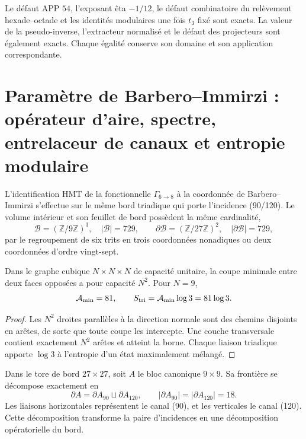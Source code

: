 \begin{remark}
Le défaut APP \(54\), l’exposant êta \(-1/12\), le défaut
combinatoire du relèvement hexade--octade et les
identités modulaires une fois \(t_3\) fixé sont exacts. La valeur
de la pseudo-inverse, l’extracteur normalisé et le défaut des projecteurs sont également exacts.
Chaque égalité conserve son domaine et son application correspondante.
\end{remark}


\section{Paramètre de Barbero--Immirzi : opérateur d'aire, spectre,
entrelaceur de canaux et entropie modulaire}
\label{p12-83-c14-s2:sec:area-entrelazamiento-barbero-rev11}

L'identification HMT de la fonctionnelle \(\Gamma_{6\to8}\) à la coordonnée
de Barbero--Immirzi s'effectue sur le même bord triadique qui porte
l'incidence (90/120). Le volume intérieur et son feuillet de bord possèdent la même cardinalité,
\[
 \mathcal B=(\mathbb Z/9\mathbb Z)^3,
 \quad |\mathcal B|=729,
 \qquad
 \partial\mathcal B=(\mathbb Z/27\mathbb Z)^2,
 \quad |\partial\mathcal B|=729,
\]
par le regroupement de six trits en trois coordonnées nonadiques ou deux
coordonnées d’ordre vingt-sept.

\begin{theorem}
\label{p12-83-c14-s2:thm:ley-areal-corte-triadico-rev11}
Dans le graphe cubique \(N\times N\times N\) de capacité unitaire, la coupe
minimale entre deux faces opposées a pour capacité \(N^2\). Pour \(N=9\),
\[
 \mathcal A_{\min}=81,
 \qquad S_{\rm tri}=\mathcal A_{\min}\log3=81\log3.
\]
\end{theorem}
\begin{proof}
Les \(N^2\) droites parallèles à la direction normale sont des chemins disjoints en
arêtes, de sorte que toute coupe les intercepte. Une couche transversale contient
exactement \(N^2\) arêtes et atteint la borne. Chaque liaison triadique apporte
\(\log3\) à l’entropie d’un état maximalement mélangé.
\end{proof}

Dans le tore de bord \(27\times27\), soit \(A\) le bloc canonique
\(9\times9\). Sa frontière se décompose exactement en
\begin{equation}
 \partial A=\partial A_{90}\sqcup\partial A_{120},
 \qquad |\partial A_{90}|=|\partial A_{120}|=18.
 \label{p12-83-c14-s2:eq:corte-90-120-rev11}
\end{equation}
Les liaisons horizontales représentent le canal (90), et les verticales le
canal (120). Cette décomposition transforme la paire d’incidences en une
décomposition opératorielle du bord.

